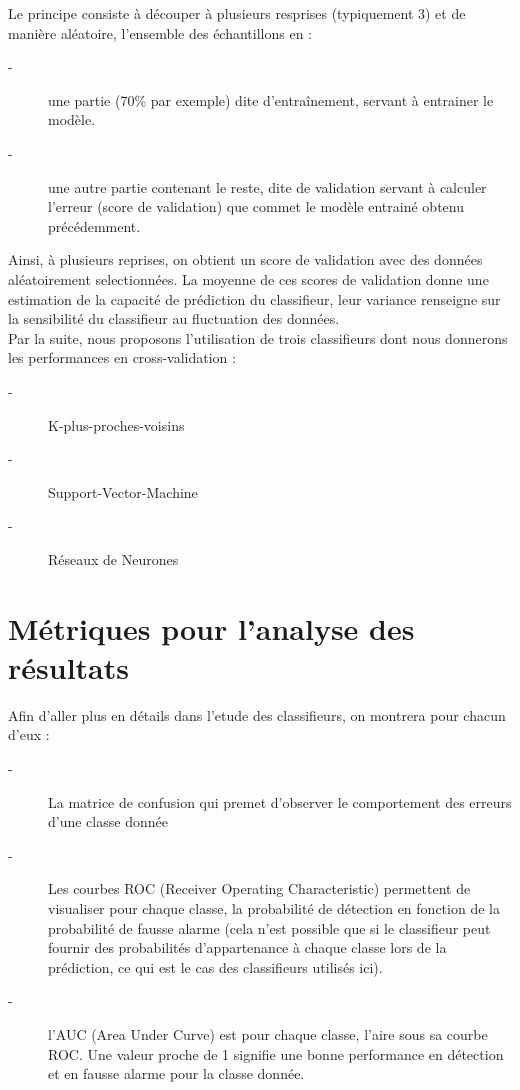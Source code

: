 \documentclass{book}
\begin{document}
Le principe consiste à découper à plusieurs resprises (typiquement 3) et de manière aléatoire, l'ensemble des échantillons en :
\begin{description}
\item[-] une partie (70\% par exemple) dite d'entraînement, servant à entrainer le modèle.
\item[-] une autre partie contenant le reste, dite de validation servant à calculer l'erreur (score de validation) que commet le modèle entrainé obtenu précédemment.
\end{description}
Ainsi, à plusieurs reprises, on obtient un score de validation avec des données aléatoirement selectionnées.
La moyenne de ces scores de validation donne une estimation de la capacité de prédiction du classifieur, leur variance renseigne sur la sensibilité du classifieur au fluctuation des données.\\
Par la suite, nous proposons l'utilisation de trois classifieurs dont nous donnerons les performances en cross-validation :
\begin{description}
\item[-] \begin{itshape}K-plus-proches-voisins\end{itshape}
\item[-] \begin{itshape}Support-Vector-Machine\end{itshape}
\item[-] \begin{itshape}Réseaux de Neurones\end{itshape}
\end{description}


\section{Métriques pour l'analyse des résultats}

Afin d'aller plus en détails dans l'etude des classifieurs, on montrera pour chacun d'eux :
\begin{description}
 \item [-] La matrice de confusion qui premet d'observer le comportement des erreurs d'une classe donnée
 \item[-] Les courbes ROC (Receiver Operating Characteristic) permettent de visualiser pour chaque classe, la probabilité de détection en fonction de la probabilité de fausse alarme (cela n'est possible que si le classifieur peut
 fournir des probabilités d'appartenance à chaque classe lors de la prédiction, ce qui est le cas des classifieurs utilisés ici).
 \item[-] l'AUC (Area Under Curve) est pour chaque classe, l'aire sous sa courbe ROC. Une valeur proche de 1 signifie une bonne performance en détection et en fausse alarme pour la classe donnée.
\end{description}
 
\end{document}
